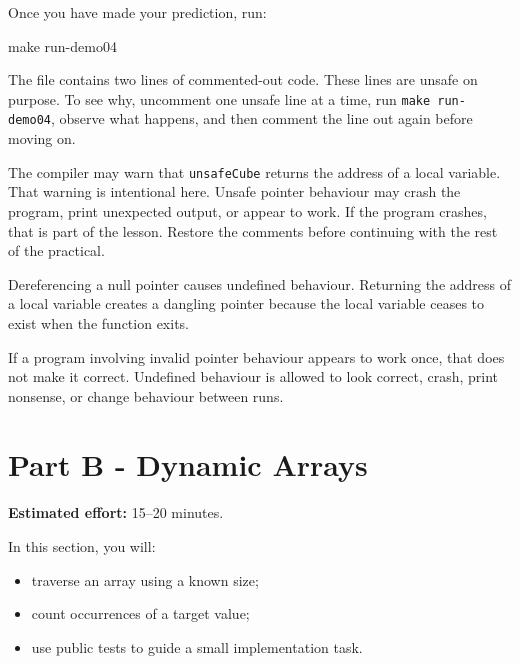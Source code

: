 \documentclass{csc2059practical}
\begin{document}
Once you have made your prediction, run:

\begin{bashcode}
make run-demo04
\end{bashcode}

The file contains two lines of commented-out code. These lines are unsafe on purpose. To see why, uncomment one unsafe line at a time, run \texttt{make run-demo04}, observe what happens, and then comment the line out again before moving on.

\begin{importantnote}
The compiler may warn that \texttt{unsafeCube} returns the address of a local variable. That warning is intentional here. Unsafe pointer behaviour may crash the program, print unexpected output, or appear to work. If the program crashes, that is part of the lesson. Restore the comments before continuing with the rest of the practical.
\end{importantnote}

\begin{commonerror}
Dereferencing a null pointer causes undefined behaviour. Returning the address of a local variable creates a dangling pointer because the local variable ceases to exist when the function exits.
\end{commonerror}
\clearpage
\begin{tipbox}
If a program involving invalid pointer behaviour appears to work once, that does not make it correct. Undefined behaviour is allowed to look correct, crash, print nonsense, or change behaviour between runs.
\end{tipbox}

\section{Part B - Dynamic Arrays}


\begin{infobox}
\textbf{Estimated effort:} 15--20 minutes.
\end{infobox}

\begin{learningoutcomes}
In this section, you will:
\begin{itemize}
  \item traverse an array using a known size;
  \item count occurrences of a target value;
  \item use public tests to guide a small implementation task.
\end{itemize}
\end{learningoutcomes}
\end{document}
